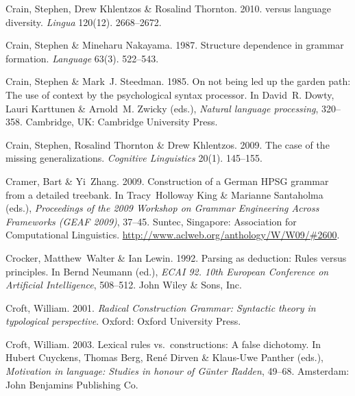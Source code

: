 \begin{thebibliography}{1420}
Crain, Stephen, Drew Khlentzos \& Rosalind Thornton. 2010.
 versus language diversity.
\newblock \emph{Lingua} 120(12). 2668--2672.

Crain, Stephen \& Mineharu Nakayama. 1987.
\newblock Structure dependence in grammar formation.
\newblock \emph{Language} 63(3). 522--543.

Crain, Stephen \& Mark~J. Steedman. 1985.
\newblock On not being led up the garden path: {The} use of context by the
  psychological syntax processor.
\newblock In David~R. Dowty, Lauri Karttunen \& Arnold~M. Zwicky (eds.),
  \emph{Natural language processing}, 320--358. Cambridge, UK: Cambridge
  University Press.

Crain, Stephen, Rosalind Thornton \& Drew Khlentzos. 2009.
\newblock The case of the missing generalizations.
\newblock \emph{Cognitive Linguistics} 20(1). 145--155.

Cramer, Bart \& Yi~Zhang. 2009.
\newblock Construction of a {German} {HPSG} grammar from a detailed treebank.
\newblock In Tracy~Holloway King \& Marianne Santaholma (eds.),
  \emph{Proceedings of the 2009 {Workshop on Grammar Engineering Across
  Frameworks (GEAF 2009)}}, 37--45. Suntec, Singapore: Association for
  Computational Linguistics.
\newblock \urlprefix\url{http://www.aclweb.org/anthology/W/W09/#2600}.

Crocker, Matthew~Walter \& Ian Lewin. 1992.
\newblock Parsing as deduction: {Rules} versus principles.
\newblock In Bernd Neumann (ed.), \emph{{ECAI 92}. 10th {European Conference on
  Artificial Intelligence}}, 508--512. John Wiley \& Sons, Inc.

Croft, William. 2001.
\newblock \emph{{Radical Construction Grammar}: {Syntactic} theory in
  typological perspective}.
\newblock Oxford: Oxford University Press.

Croft, William. 2003.
\newblock Lexical rules vs.\ constructions: {A} false dichotomy.
\newblock In Hubert Cuyckens, Thomas Berg, Ren{\'e} Dirven \& Klaus-Uwe Panther
  (eds.), \emph{Motivation in language: {Studies} in honour of {G{\"u}nter
  Radden}}, 49--68. Amsterdam: John Benjamins Publishing Co.


\end{thebibliography}
